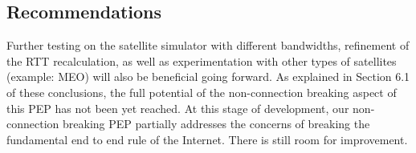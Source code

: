 \subsection*{Recommendations}
Further testing on the satellite simulator with different bandwidths, refinement of the RTT recalculation, as well as experimentation with other types of satellites  (example: MEO) will also be beneficial going forward. As explained in Section 6.1 of these conclusions, the full potential of the non-connection breaking aspect of this PEP has not been yet reached. At this stage of development, our non-connection breaking PEP partially addresses the concerns of breaking the fundamental end to end rule of the Internet. There is still room for improvement.




